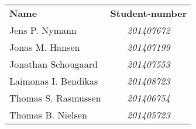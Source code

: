\begin{tabular}{l c}
	\textbf{Name} & \textbf{Student-number} \\
	Jens P. Nymann & \textsl{201407672} \\
	Jonas M. Hansen & \textsl{201407199} \\
	Jonathan Schougaard & \textsl{201407553} \\
	Laimonas I. Bendikas & \textsl{201408723} \\
	Thomas S. Rasmussen & \textsl{201406754} \\
	Thomas B. Nielsen & \textsl{201405723} \\
\end{tabular}